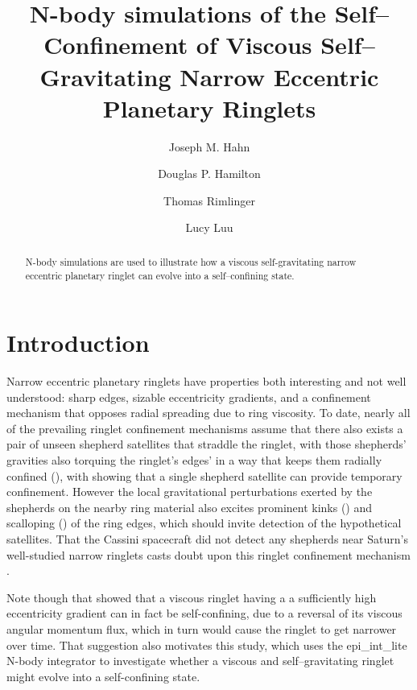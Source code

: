 \documentclass[preprint]{aastex62}
\begin{document}
\title{N-body simulations of the Self--Confinement of 
Viscous Self--Gravitating Narrow Eccentric Planetary Ringlets}


\author{Joseph M. Hahn}

\author{Douglas P. Hamilton}

\author{Thomas Rimlinger}

\author{Lucy Luu}


\begin{abstract}

N-body simulations are used
to illustrate how a viscous self-gravitating narrow eccentric planetary ringlet can evolve into a 
self--confining state.

\end{abstract}




\section{Introduction}
\label{sec:intro}

Narrow eccentric planetary ringlets have properties both interesting and
not well understood: sharp edges,
sizable eccentricity gradients, and a confinement mechanism that
opposes radial spreading due to ring viscosity. To date, nearly all of the
prevailing ringlet confinement mechanisms assume that there also exists a pair of 
unseen shepherd satellites that straddle the ringlet, with those shepherds' gravities
also torquing the ringlet's edges' in a way that keeps them radially confined 
(\citealt{GT79, GT79c, GT81, CG00, ME02}), with \cite{Getal95} showing
that a single shepherd satellite can provide temporary confinement.
However the local gravitational perturbations exerted by 
the shepherds on the nearby ring material also excites prominent kinks (\citealt{Metal05}) and 
scalloping (\citealt{Wetal09}) of the ring edges,
which should invite detection of the hypothetical satellites.
That the Cassini spacecraft did not detect any shepherds near Saturn's
well-studied narrow ringlets casts doubt upon this ringlet confinement 
mechanism \citep{L18}. 

Note though that \cite{BGT82} showed that a viscous ringlet having a
a sufficiently high eccentricity gradient can in fact be self-confining,
due to a reversal of its viscous angular momentum flux, which in turn would
cause the ringlet to get narrower over time. 
That suggestion also motivates this study,
which uses the epi\_int\_lite N-body integrator to investigate whether a 
viscous and self--gravitating ringlet might evolve into a self-confining state.
\end{document}
